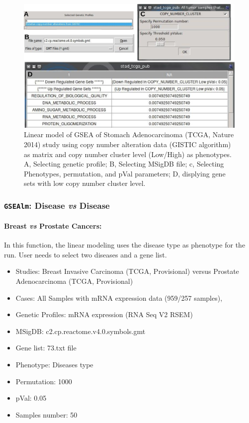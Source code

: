 \documentclass[a4paper]{article}
\begin{document}
 
 \begin{figure}[!ht]
  \centering
 \includegraphics[scale=2]{image/stadGSEAlmCNA.png}
 \caption{Linear model of GSEA of Stomach Adenocarcinoma (TCGA, Nature 2014) study using copy number alteration data (GISTIC algorithm) as matrix and copy number cluster level (Low/High) as phenotypes. A, Selecting genetic profile; B, Selecting MSigDB file; c, Selecting Phenotypes, permutation, and pVal parameters; D, displying gene sets with low copy number cluster level.}
 \label{stadGSEAlmCNA}
 \end{figure}
 
 \newpage
\subsubsection{\texttt{GSEAlm}: Disease \emph{vs} Disease}

\paragraph{Breast \emph{vs} Prostate Cancers:}

In this function, the linear modeling uses the disease type as phenotype for the run. User needs to select two diseases and a gene list.

\begin{itemize}
    \item Studies: Breast Invasive Carcinoma (TCGA, Provisional) versus Prostate Adenocarcinoma (TCGA, Provisional)
    \item Cases: All Samples with mRNA expression data (959/257 samples),
    \item Genetic Profiles: mRNA expression (RNA Seq V2 RSEM)
    \item MSigDB: c2.cp.reactome.v4.0.symbols.gmt
    \item Gene list: 73.txt file
    \item Phenotype: Diseases type
    \item Permutation: 1000
    \item pVal: 0.05
    \item Samples number: 50
 \end{itemize}
\end{document}
